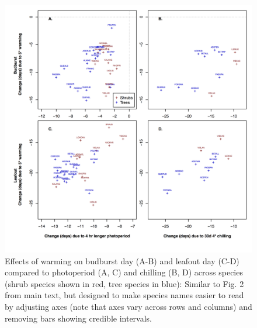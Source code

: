 \documentclass{article}
\begin{document}
\begin{figure}
\label{fig:figS5}
\includegraphics[width=1\textwidth]{Fig2_4panel_ZoomSupp.png}
\caption{Effects of warming on budburst day (A-B) and leafout day (C-D) compared to photoperiod (A, C) and chilling (B, D) across species (shrub species shown in red, tree species in blue): Similar to Fig. 2 from main text, but designed to make species names easier to read by adjusting axes (note that axes vary across rows and columns) and removing bars showing credible intervals. }
\end{figure}
\end{document}
